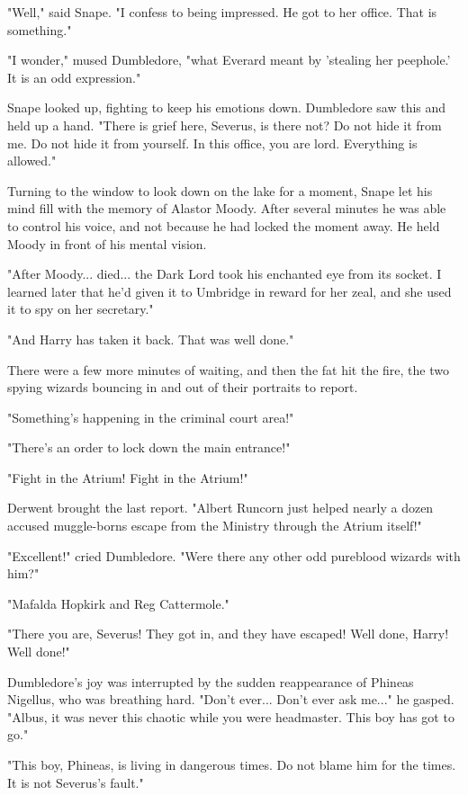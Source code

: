 \documentclass[a4paper,11pt]{article}
\begin{document}
"Well," said Snape. "I confess to being impressed. He got to her office. That is something."

"I wonder," mused Dumbledore, "what Everard meant by 'stealing her peephole.' It is an odd expression."

Snape looked up, fighting to keep his emotions down. Dumbledore saw this and held up a hand. "There is grief here, Severus, is there not? Do not hide it from me. Do not hide it from yourself. In this office, you are lord. Everything is allowed."

Turning to the window to look down on the lake for a moment, Snape let his mind fill with the memory of Alastor Moody. After several minutes he was able to control his voice, and not because he had locked the moment away. He held Moody in front of his mental vision.

"After Moody... died... the Dark Lord took his enchanted eye from its socket. I learned later that he'd given it to Umbridge in reward for her zeal, and she used it to spy on her secretary."

"And Harry has taken it back. That was well done."

There were a few more minutes of waiting, and then the fat hit the fire, the two spying wizards bouncing in and out of their portraits to report.

"Something's happening in the criminal court area!"

"There's an order to lock down the main entrance!"

"Fight in the Atrium! Fight in the Atrium!"

Derwent brought the last report. "Albert Runcorn just helped nearly a dozen accused muggle-borns escape from the Ministry through the Atrium itself!"

"Excellent!" cried Dumbledore. "Were there any other odd pureblood wizards with him?"

"Mafalda Hopkirk and Reg Cattermole."

"There you are, Severus! They got in, and they have escaped! Well done, Harry! Well done!"

Dumbledore's joy was interrupted by the sudden reappearance of Phineas Nigellus, who was breathing hard. "Don't ever... Don't ever ask me..." he gasped. "Albus, it was never this chaotic while you were headmaster. This boy has got to go."

"This boy, Phineas, is living in dangerous times. Do not blame him for the times. It is not Severus's fault."
\end{document}
